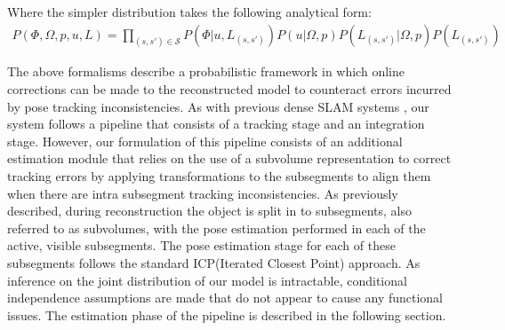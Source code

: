 Where the simpler distribution takes the following analytical form:
\begin{equation}
\begin{split}
P(\Phi, \Omega, p, u, L) = 
\prod_{(s, s') \in \mathcal{S}} P(\Phi|u, L_{(s, s')})
P(u|\Omega, p)
P(L_{(s, s')}|\Omega, p)
P(L_{(s, s')})
\end{split}
\end{equation}

The above formalisms describe a probabilistic framework in which online corrections can be made to the reconstructed model to counteract 
errors incurred by pose tracking inconsistencies. As with previous dense SLAM systems \cite{Newcombe2011, Prisacariu2014, Niessner2013}, 
our system follows a pipeline that consists of a tracking stage and an integration stage. However, our formulation of this pipeline 
consists of an additional estimation module that relies on the use of a subvolume representation to correct tracking errors by applying 
transformations to the subsegments to align them when there are intra subsegment tracking inconsistencies. 
As previously described, during reconstruction the object is split in to subsegments, also referred to as subvolumes, 
with the pose estimation performed in each of the active, visible subsegments. The pose estimation stage for each of these subsegments follows 
the standard ICP(Iterated Closest Point) approach.
As inference on the joint distribution of our model is intractable, conditional independence assumptions are made that do not appear 
to cause any functional issues. The estimation phase of the pipeline is described in the following section.

